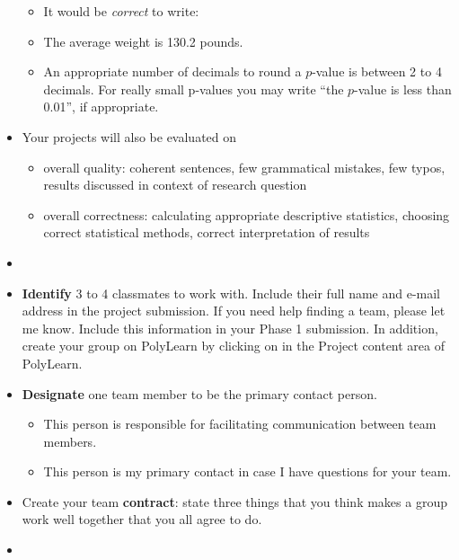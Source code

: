 \documentclass[letterpaper,12pt]{report}
\begin{document}
\begin{itemize}
\begin{itemize}
        \item It would be \emph{correct} to write:
        \item[] The average weight is 130.2 pounds.
        \item An appropriate number of decimals to round a $p$-value is between 2 to 4 decimals.  For really small p-values you may write ``the $p$-value is less than 0.01'', if appropriate.
    \end{itemize}
    \item Your projects will also be evaluated on
    \begin{itemize}
    \item overall quality: coherent sentences, few grammatical mistakes, few typos, results discussed in context of research question
    \item overall correctness: calculating appropriate descriptive statistics, choosing correct statistical methods, correct interpretation of results
    \end{itemize}
    \item[]
\end{itemize}

\clearpage
{}
\begin{itemize}
    \item \textbf{Identify} 3 to 4 classmates to work with.  Include their full name and e-mail address in the project submission.  If you need help finding a team, please let me know.  Include this information in your Phase 1 submission.  In addition, create  your group on PolyLearn by clicking on  in the Project content area of PolyLearn.
    \item \textbf{Designate} one team member to be the primary contact person.
    \begin{itemize}
        \item This person is responsible for facilitating communication between team members.
        \item This person is my primary contact in case I have questions for your team.
    \end{itemize}
    \item Create your team \textbf{contract}: state three things that you think makes a group work well together that you all agree to do.
    \item[]
\end{itemize}
\end{document}
